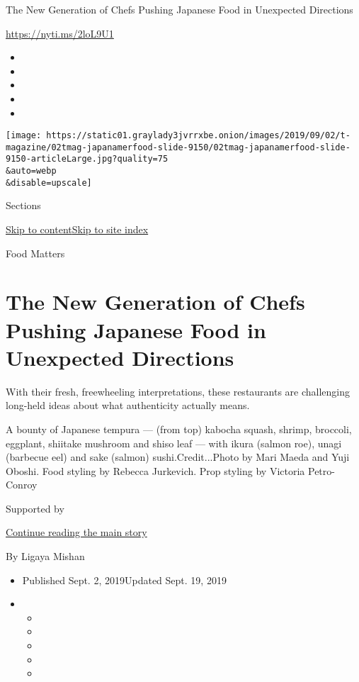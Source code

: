 The New Generation of Chefs Pushing Japanese Food in Unexpected
Directions

\url{https://nyti.ms/2loL9U1}

\begin{itemize}
\item
\item
\item
\item
\item
\end{itemize}

\texttt{[image: https://static01.graylady3jvrrxbe.onion/images/2019/09/02/t-magazine/02tmag-japanamerfood-slide-9150/02tmag-japanamerfood-slide-9150-articleLarge.jpg?quality=75\\\&auto=webp\\\&disable=upscale]}

Sections

\protect\hyperlink{site-content}{Skip to
content}\protect\hyperlink{site-index}{Skip to site index}

Food Matters

\hypertarget{the-new-generation-of-chefs-pushing-japanese-food-in-unexpected-directions}{%
\section{The New Generation of Chefs Pushing Japanese Food in Unexpected
Directions}\label{the-new-generation-of-chefs-pushing-japanese-food-in-unexpected-directions}}

With their fresh, freewheeling interpretations, these restaurants are
challenging long-held ideas about what authenticity actually means.

A bounty of Japanese tempura --- (from top) kabocha squash, shrimp,
broccoli, eggplant, shiitake mushroom and shiso leaf --- with ikura
(salmon roe), unagi (barbecue eel) and sake (salmon)
sushi.Credit...Photo by Mari Maeda and Yuji Oboshi. Food styling by
Rebecca Jurkevich. Prop styling by Victoria Petro-Conroy

Supported by

\protect\hyperlink{after-sponsor}{Continue reading the main story}

By Ligaya Mishan

\begin{itemize}
\item
  Published Sept. 2, 2019Updated Sept. 19, 2019
\item
  \begin{itemize}
  \item
  \item
  \item
  \item
  \item
  \end{itemize}
\end{itemize}

